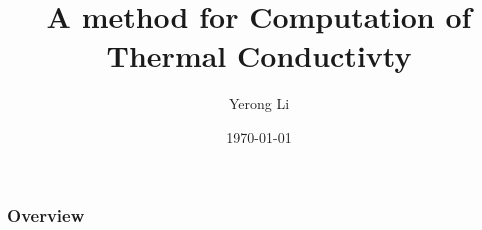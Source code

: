 \documentclass{beamer}
\title[Thermal Conductivity]{A method for Computation of Thermal Conductivty} %
\author{Yerong Li} %
\institute[NJU]{}%
\date{\today} %
\begin{document}
\begin{frame}
\titlepage %
\end{frame}

\begin{frame}
\frametitle{Overview} %
\tableofcontents %
\end{frame}

\end{document}
